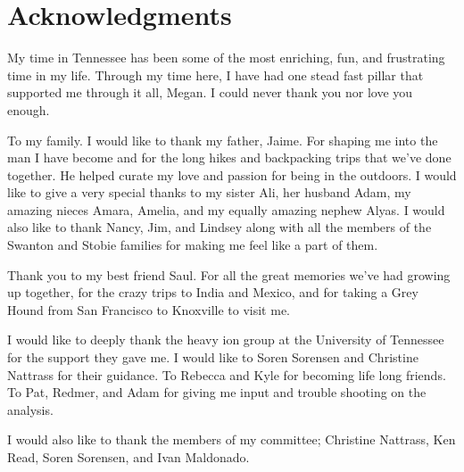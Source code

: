 \chapter*{Acknowledgments}\label{ch:acknowledgments}
My time in Tennessee has been some of the most enriching, fun, and frustrating time in my life.  Through my time here, I have had one stead fast pillar that supported me through it all, Megan.  I could never thank you nor love you enough.

\par
To my family. I would like to thank my father, Jaime.  For shaping me into the man I have become and for the long hikes and backpacking trips that we've done together.  He helped curate my love and passion for being in the outdoors.  I would like to give a very special thanks to my sister Ali, her husband Adam, my amazing nieces Amara, Amelia, and my equally amazing nephew Alyas.  I would also like to thank Nancy, Jim, and Lindsey along with all the members of the Swanton and Stobie families for making me feel like a part of them.  

\par
Thank you to my best friend Saul.  For all the great memories we've had growing up together, for the crazy trips to India and Mexico, and for taking a Grey Hound from San Francisco to Knoxville to visit me.  

\par
I would like to deeply thank the heavy ion group at the University of Tennessee for the support they gave me.  I would like to Soren Sorensen and Christine Nattrass for their guidance.  To Rebecca and Kyle for becoming life long friends.  To Pat, Redmer, and Adam for giving me input and trouble shooting on the analysis.

\par 
I would also like to thank the members of my committee; Christine Nattrass, Ken Read, Soren Sorensen, and Ivan Maldonado. 

